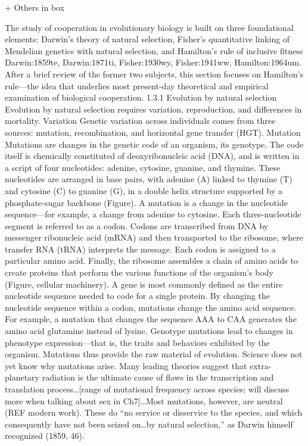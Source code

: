 \documentclass{tufte-book} %
\begin{document}
+ Others in box

The study of cooperation in evolutionary biology is built on three foundational elements: Darwin’s theory of natural selection, Fisher’s quantitative linking of Mendelian genetics with natural selection, and Hamilton’s rule of inclusive fitness {Darwin:1859te, Darwin:1871ti, Fisher:1930wy, Fisher:1941ww, Hamilton:1964um}. After a brief review of the former two subjects, this section focuses on Hamilton’s rule—the idea that underlies most present-day theoretical and empirical examination of biological cooperation. 
	1.3.1	Evolution by natural selection
Evolution by natural selection requires variation, reproduction, and differences in mortality.
Variation
Genetic variation across individuals comes from three sources: mutation, recombination, and horizontal gene transfer (HGT).
Mutation
Mutations are changes in the genetic code of an organism, its genotype. The code itself is chemically constituted of deoxyribonucleic acid (DNA), and is written in a script of four nucleotides: adenine, cytosine, guanine, and thymine. These nucleotides are arranged in base pairs, with adenine (A) linked to thymine (T) and cytosine (C) to guanine (G), in a double helix structure supported by a phosphate-sugar backbone (Figure). A mutation is a change in the nucleotide sequence—for example, a change from adenine to cytosine. Each three-nucleotide segment is referred to as a codon. Codons are transcribed from DNA by messenger ribonucleic acid (mRNA) and then transported to the ribosome, where transfer RNA (tRNA) interprets the message. Each codon is assigned to a particular amino acid.  Finally, the ribosome assembles a chain of amino acids to create proteins that perform the various functions of the organism’s body (Figure, cellular machinery). A gene is most commonly defined as the entire nucleotide sequence needed to code for a single protein. By changing the nucleotide sequence within a codon, mutations change the amino acid sequence. For example, a mutation that changes the sequence AAA to CAA generates the amino acid glutamine instead of lysine. Genotype mutations lead to changes in phenotype expression—that is, the traits and behaviors exhibited by the organism. 
Mutations thus provide the raw material of evolution. Science does not yet know why mutations arise. Many leading theories suggest that extra-planetary radiation is the ultimate cause of flaws in the transcription and translation process…[range of mutational frequency across species; will discuss more when talking about sex in Ch7]…Most mutations, however, are neutral (REF modern work). These do “no service or disservice to the species, and which consequently have not been seized on…by natural selection,” as Darwin himself recognized (1859, 46). 
\end{document}
